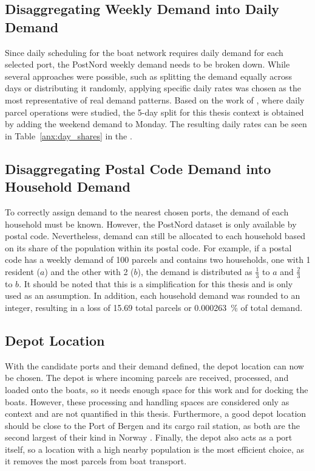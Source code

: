 \documentclass[12pt]{article}
\begin{document}
\subsection{Disaggregating Weekly Demand into Daily Demand}
\label{subsec:weekly-to-daily-demand}

Since daily scheduling for the boat network requires daily demand for each selected port, the PostNord weekly demand needs to be broken down. While several approaches were possible, such as splitting the demand equally across days or distributing it randomly, applying specific daily rates was chosen as the most representative of real demand patterns. Based on the work of \cite{dailydemand}, where daily parcel operations were studied, the 5-day split for this thesis context is obtained by adding the weekend demand to Monday. The resulting daily rates can be seen in Table~\ref{anx:day_shares} in the .

\subsection{Disaggregating Postal Code Demand into Household Demand}
\label{subsec:postal-code-to-household-demand}

To correctly assign demand to the nearest chosen ports, the demand of each household must be known. However, the PostNord dataset is only available by postal code. Nevertheless, demand can still be allocated to each household based on its share of the population within its postal code. For example, if a postal code has a weekly demand of 100 parcels and contains two households, one with 1 resident (\(a\)) and the other with 2 (\(b\)), the demand is distributed as \(\frac{1}{3}\) to \(a\) and \(\frac{2}{3}\) to \(b\). It should be noted that this is a simplification for this thesis and is only used as an assumption. In addition, each household demand was rounded to an integer, resulting in a loss of \num{15.69} total parcels or \qty{0.000263}{\percent} of total demand.

\subsection{Depot Location}
\label{subsec:depot-location}

With the candidate ports and their demand defined, the depot location can now be chosen. The depot is where incoming parcels are received, processed, and loaded onto the boats, so it needs enough space for this work and for docking the boats. However, these processing and handling spaces are considered only as context and are not quantified in this thesis. Furthermore, a good depot location should be close to the Port of Bergen and its cargo rail station, as both are the second largest of their kind in Norway \parencite{bergenport,bergenrail}. Finally, the depot also acts as a port itself, so a location with a high nearby population is the most efficient choice, as it removes the most parcels from boat transport.
\end{document}
